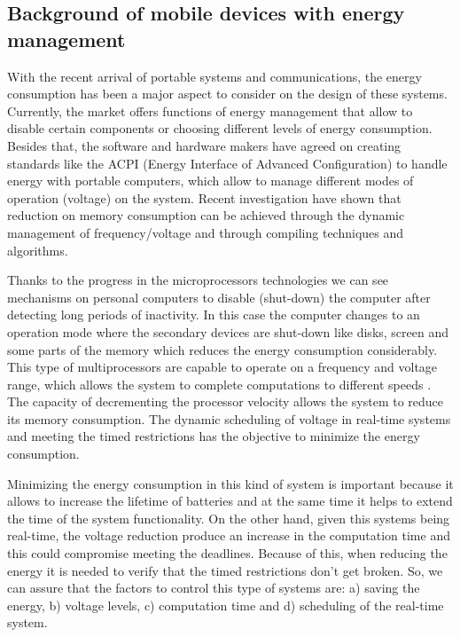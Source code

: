 \documentclass[conference]{IEEEtran}
\begin{document}
 \subsection{Background of mobile devices with energy management}

 With the recent arrival of portable systems and communications, the energy consumption has been a major aspect to consider on the design of these systems. Currently, the market offers functions of energy management that allow to disable certain components or choosing different levels of energy consumption. Besides that, the software and hardware makers have agreed on creating standards like the ACPI (Energy Interface of Advanced Configuration) to handle energy with portable computers, which allow to manage different modes of operation (voltage) on the system. Recent investigation have shown that reduction on memory consumption can be achieved through the dynamic management of frequency/voltage and through compiling techniques and algorithms.
 
 Thanks to the progress in the microprocessors technologies we can see mechanisms on personal computers to disable (shut-down) the computer after detecting long periods of inactivity. In this case the computer changes to an operation mode where the secondary devices are shut-down like disks, screen and some parts of the memory which reduces the energy consumption considerably. This type of multiprocessors are capable to operate on a frequency and voltage range, which allows the system to complete computations to different speeds \cite{PADM01}. The capacity of decrementing the processor velocity allows the system to reduce its memory consumption. The dynamic scheduling of voltage in real-time systems and meeting the timed restrictions has the objective to minimize the energy consumption.

 Minimizing the energy consumption in this kind of system is important because it allows to increase the lifetime of batteries and at the same time it helps to extend the time of the system functionality. On the other hand, given this systems being real-time, the voltage reduction produce an increase in the computation time and this could compromise meeting the deadlines. Because of this, when reducing the energy it is needed to verify that the timed restrictions don't get broken. So, we can assure that the factors to control this type of systems are: a) saving the energy, b) voltage levels, c) computation time and d) scheduling of the real-time system.
 
\end{document}
